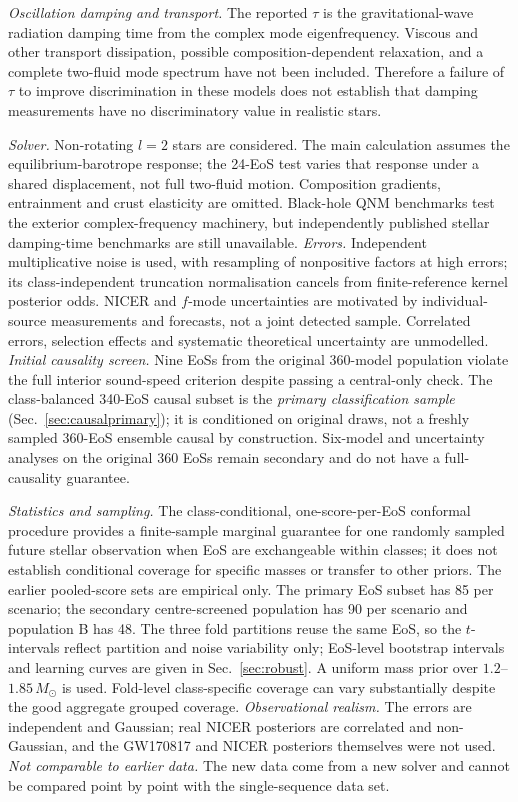 \documentclass[11pt,a4paper]{article}
\newcommand{\Msun}{M_\odot}
\begin{document}
\emph{Oscillation damping and transport.} The reported $\tau$ is the gravitational-wave radiation damping time from the complex mode eigenfrequency. Viscous and other transport dissipation, possible composition-dependent relaxation, and a complete two-fluid mode spectrum have not been included. Therefore a failure of $\tau$ to improve discrimination in these models does not establish that damping measurements have no discriminatory value in realistic stars. \par
\emph{Solver.} Non-rotating $l=2$ stars are considered. The main calculation assumes the equilibrium-barotrope response; the 24-EoS test varies that response under a shared displacement, not full two-fluid motion. Composition gradients, entrainment and crust elasticity are omitted. Black-hole QNM benchmarks test the exterior complex-frequency machinery, but independently published stellar damping-time benchmarks are still unavailable.
\emph{Errors.} Independent multiplicative noise is used, with resampling of nonpositive factors at high errors; its class-independent truncation normalisation cancels from finite-reference kernel posterior odds. NICER and $f$-mode uncertainties are motivated by individual-source measurements and forecasts, not a joint detected sample. Correlated errors, selection effects and systematic theoretical uncertainty are unmodelled.
\emph{Initial causality screen.} Nine EoSs from the original 360-model population violate the full interior sound-speed criterion despite passing a central-only check. The class-balanced 340-EoS causal subset is the \emph{primary classification sample} (Sec.~\ref{sec:causalprimary}); it is conditioned on original draws, not a freshly sampled 360-EoS ensemble causal by construction. Six-model and uncertainty analyses on the original 360 EoSs remain secondary and do not have a full-causality guarantee.\par
\emph{Statistics and sampling.} The class-conditional, one-score-per-EoS conformal procedure provides a finite-sample marginal guarantee for one randomly sampled future stellar observation when EoS are exchangeable within classes; it does not establish conditional coverage for specific masses or transfer to other priors. The earlier pooled-score sets are empirical only. The primary EoS subset has 85 per scenario; the secondary centre-screened population has 90 per scenario and population B has 48. The three fold partitions reuse the same EoS, so the $t$-intervals reflect partition and noise variability only; EoS-level bootstrap intervals and learning curves are given in Sec.~\ref{sec:robust}. A uniform mass prior over $1.2$--$1.85\,\Msun$ is used. Fold-level class-specific coverage can vary substantially despite the good aggregate grouped coverage.
\emph{Observational realism.} The errors are independent and Gaussian; real NICER posteriors are correlated and non-Gaussian, and the GW170817 and NICER posteriors themselves were not used.
\emph{Not comparable to earlier data.} The new data come from a new solver and cannot be compared point by point with the single-sequence data set.
\end{document}
